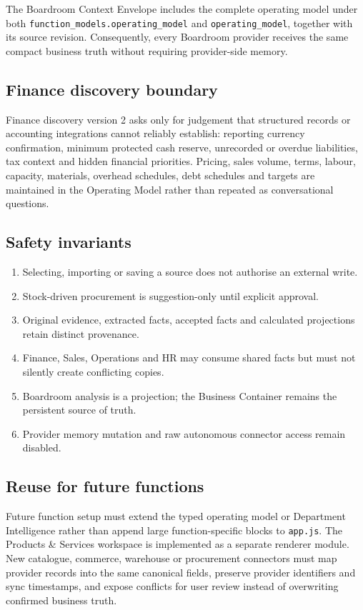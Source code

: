 The Boardroom Context Envelope includes the complete operating model under both \texttt{function\_models.operating\_model} and \texttt{operating\_model}, together with its source revision.  Consequently, every Boardroom provider receives the same compact business truth without requiring provider-side memory.

\subsection{Finance discovery boundary}

Finance discovery version 2 asks only for judgement that structured records or accounting integrations cannot reliably establish: reporting currency confirmation, minimum protected cash reserve, unrecorded or overdue liabilities, tax context and hidden financial priorities.  Pricing, sales volume, terms, labour, capacity, materials, overhead schedules, debt schedules and targets are maintained in the Operating Model rather than repeated as conversational questions.

\subsection{Safety invariants}

\begin{enumerate}
  \item Selecting, importing or saving a source does not authorise an external write.
  \item Stock-driven procurement is suggestion-only until explicit approval.
  \item Original evidence, extracted facts, accepted facts and calculated projections retain distinct provenance.
  \item Finance, Sales, Operations and HR may consume shared facts but must not silently create conflicting copies.
  \item Boardroom analysis is a projection; the Business Container remains the persistent source of truth.
  \item Provider memory mutation and raw autonomous connector access remain disabled.
\end{enumerate}

\subsection{Reuse for future functions}

Future function setup must extend the typed operating model or Department Intelligence rather than append large function-specific blocks to \texttt{app.js}.  The Products \& Services workspace is implemented as a separate renderer module.  New catalogue, commerce, warehouse or procurement connectors must map provider records into the same canonical fields, preserve provider identifiers and sync timestamps, and expose conflicts for user review instead of overwriting confirmed business truth.
